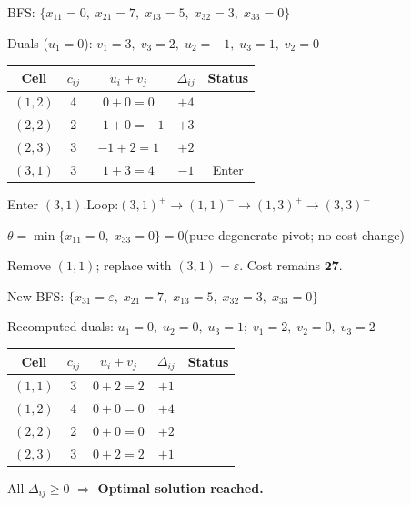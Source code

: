 \documentclass[12pt]{article}
\begin{document}
BFS: $\{x_{11}=0,\;x_{21}=7,\;x_{13}=5,\;x_{32}=3,\;x_{33}=0\}$

Duals ($u_1=0$): $v_1=3,\;v_3=2,\;u_2=-1,\;u_3=1,\;v_2=0$

\begin{center}
\renewcommand{\arraystretch}{1.3}
\begin{tabular}{|c|c|c|c|c|}
  \hline
  \rowcolor{primary}
  {\color{white}\textbf{Cell}} & {\color{white}$c_{ij}$} &
  {\color{white}$u_i+v_j$} & {\color{white}$\Delta_{ij}$} & {\color{white}\textbf{Status}} \\
  \hline
  $(1,2)$ & 4 & $0+0=0$ & $+4$ & \\
  \hline
  $(2,2)$ & 2 & $-1+0=-1$ & $+3$ & \\
  \hline
  $(2,3)$ & 3 & $-1+2=1$ & $+2$ & \\
  \hline
  \rowcolor{red!15}$(3,1)$ & 3 & $1+3=4$ & $-1$ & Enter \\
  \hline
\end{tabular}
\end{center}

Enter $(3,1)$.\quad Loop:\;$(3,1)^+ \to (1,1)^- \to (1,3)^+ \to (3,3)^-$

$\theta = \min\{x_{11}=0,\;x_{33}=0\} = 0$\quad (pure degenerate pivot; no cost change)

Remove $(1,1)$; replace with $(3,1)=\varepsilon$. Cost remains $\mathbf{27}$.

\medskip
New BFS: $\{x_{31}=\varepsilon,\;x_{21}=7,\;x_{13}=5,\;x_{32}=3,\;x_{33}=0\}$

Recomputed duals: $u_1=0,\;u_2=0,\;u_3=1;\;v_1=2,\;v_2=0,\;v_3=2$

\begin{center}
\renewcommand{\arraystretch}{1.3}
\begin{tabular}{|c|c|c|c|c|}
  \hline
  \rowcolor{primary}
  {\color{white}\textbf{Cell}} & {\color{white}$c_{ij}$} &
  {\color{white}$u_i+v_j$} & {\color{white}$\Delta_{ij}$} & {\color{white}\textbf{Status}} \\
  \hline
  $(1,1)$ & 3 & $0+2=2$ & $+1$ & \\
  \hline
  $(1,2)$ & 4 & $0+0=0$ & $+4$ & \\
  \hline
  $(2,2)$ & 2 & $0+0=0$ & $+2$ & \\
  \hline
  $(2,3)$ & 3 & $0+2=2$ & $+1$ & \\
  \hline
\end{tabular}
\end{center}

All $\Delta_{ij} \geq 0$ $\Rightarrow$ \textbf{Optimal solution reached.}
\end{document}
